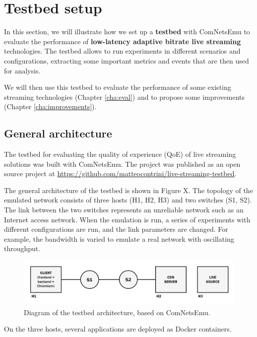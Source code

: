 \chapter{Testbed setup}
\label{cha:testbed}

In this section, we will illustrate how we set up a \textbf{testbed} with ComNetsEmu to evaluate the performance of \textbf{low-latency adaptive bitrate live streaming} technologies. The testbed allows to run experiments in different scenarios and configurations, extracting some important metrics and events that are then used for analysis. 

We will then use this testbed to evaluate the performance of some existing streaming technologies (Chapter \ref{cha:eval}) and to propose some improvements (Chapter \ref{cha:improvements}).

\section{General architecture}
\label{sec:testbed/architecture}

The testbed for evaluating the quality of experience (QoE) of live streaming solutions was built with ComNetsEmu. The project was published as an open source project at \url{https://github.com/matteocontrini/live-streaming-testbed}.

The general architecture of the testbed is shown in Figure X. The topology of the emulated network consists of three hosts (H1, H2, H3) and two switches (S1, S2). The link between the two switches represents an unreliable network such as an Internet access network. When the emulation is run, a series of experiments with different configurations are run, and the link parameters are changed. For example, the bandwidth is varied to emulate a real network with oscillating throughput.

\begin{figure}[h]
    \centering
    \includegraphics[width=\textwidth]{res/testbed.png}
    \caption{Diagram of the testbed architecture, based on ComNetsEmu.}
    \label{fig:testbed}
\end{figure}

On the three hosts, several applications are deployed as Docker containers.

